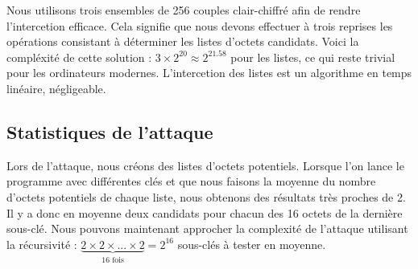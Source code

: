 \indent Nous utilisons trois ensembles de 256 couples clair-chiffré afin de rendre l'intercetion efficace. Cela signifie que nous devons effectuer à trois reprises les opérations consistant à déterminer les listes d'octets candidats. Voici la compléxité de cette solution : $3 \times 2^{20} \approx 2^{21.58}$ pour les listes, ce qui reste trivial pour les ordinateurs modernes. L'intercetion des listes est un algorithme en temps linéaire, négligeable.

\subsection{Statistiques de l'attaque}

\indent Lors de l'attaque, nous créons des listes d'octets potentiels. Lorsque l'on lance le programme avec différentes clés et que nous faisons la moyenne du nombre d'octets potentiels de chaque liste, nous obtenons des résultats très proches de 2. Il y a donc en moyenne deux candidats pour chacun des 16 octets de la dernière sous-clé. Nous pouvons maintenant approcher la complexité de l'attaque utilisant la récursivité : $\underbrace{2 \times 2 \times ... \times 2}_{\text{16 fois}} = 2^{16}$ sous-clés à tester en moyenne.